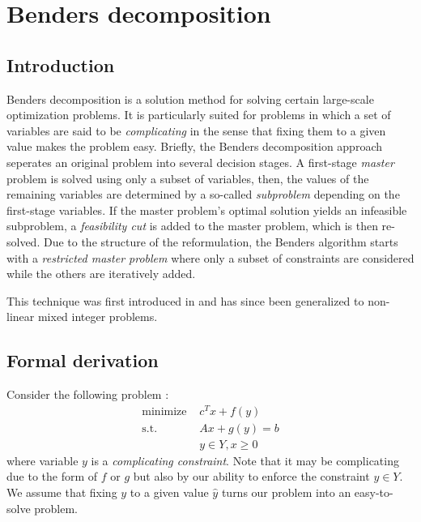 \chapter{Benders decomposition}

\section{Introduction}

Benders decomposition is a solution method for solving certain large-scale optimization problems. It is particularly suited for problems in which a set of variables are said to be \textit{complicating} in the sense that fixing them to a given value makes the problem easy. Briefly, the Benders decomposition approach seperates an original problem into several decision stages. A first-stage \textit{master} problem is solved using only a subset of variables, then, the values of the remaining variables are determined by a so-called \textit{subproblem} depending on the first-stage variables. If the master problem's optimal solution yields an infeasible subproblem, a \textit{feasibility cut} is added to the master problem, which is then re-solved. Due to the structure of the reformulation, the Benders algorithm starts with a \textit{restricted master problem} where only a subset of constraints are considered while the others are iteratively added. 

This technique was first introduced in \cite{Benders1962} and has since been generalized to non-linear mixed integer problems. 

\section{Formal derivation}

Consider the following problem :
\begin{align}
    \textrm{minimize } & c^Tx + f(y) \\
    \textrm{s.t. } & Ax + g(y) = b \\
    & y\in Y, x\ge 0
\end{align} where variable $y$ is a \textit{complicating constraint}. Note that it may be complicating due to the form of $f$ or $g$ but also by our ability to enforce the constraint $y\in Y$. We assume that fixing $y$ to a given value $\hat y$ turns our problem into an easy-to-solve problem. 

